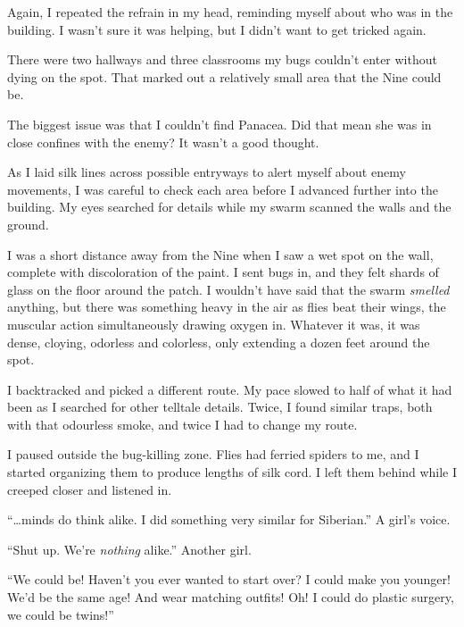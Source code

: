 Again, I repeated the refrain in my head, reminding myself about who was in the building.  I wasn't sure it was helping, but I didn't want to get tricked again.



There were two hallways and three classrooms my bugs couldn't enter without dying on the spot. That marked out a relatively small area that the Nine could be.



The biggest issue was that I couldn't find Panacea.  Did that mean she was in close confines with the enemy?  It wasn't a good thought.



As I laid silk lines across possible entryways to alert myself about enemy movements, I was careful to check each area before I advanced further into the building.  My eyes searched for details while my swarm scanned the walls and the ground.



I was a short distance away from the Nine when I saw a wet spot on the wall, complete with discoloration of the paint.  I sent bugs in, and they felt shards of glass on the floor around the patch.  I wouldn't have said that the swarm \emph{smelled} anything, but there was something heavy in the air as flies beat their wings, the muscular action simultaneously drawing oxygen in.  Whatever it was, it was dense, cloying, odorless and colorless, only extending a dozen feet around the spot.



I backtracked and picked a different route.  My pace slowed to half of what it had been as I searched for other telltale details.  Twice, I found similar traps, both with that odourless smoke, and twice I had to change my route.



I paused outside the bug-killing zone.  Flies had ferried spiders to me, and I started organizing them to produce lengths of silk cord.  I left them behind while I creeped closer and listened in.



``\ldots{}minds do think alike.  I did something very similar for Siberian.''  A girl's voice.



``Shut up.  We're \emph{nothing} alike.''  Another girl.



``We could be!  Haven't you ever wanted to start over?  I could make you younger!  We'd be the same age!  And wear matching outfits!  Oh!  I could do plastic surgery, we could be twins!''



